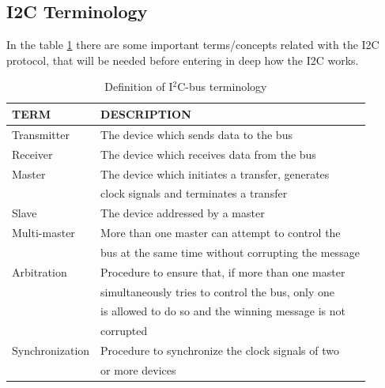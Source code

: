 \subsection{I2C Terminology}
\label{chap:Back_I2C_Terminology}

In the table \ref{tab:i2c_terminology} there are some important terms/concepts related with the 
I2C protocol, that will be needed before entering in deep how the I2C works.

\begin{table}[htbp]
    \centering
    \begin{tabular}{|l | l|}
        \toprule
        TERM            & DESCRIPTION \\        
        \midrule
        Transmitter     & The device which sends data to the bus \\
        \hline
        Receiver        & The device which receives data from the bus\\
        \hline
        Master          & The device which initiates a transfer, generates\\ 
                        & clock signals and terminates a transfer \\
        \hline
        Slave           & The device addressed by a master \\
        \hline
        Multi-master    & More than one master can attempt to control the \\
                        &  bus at the same time without corrupting the message \\
        \hline
        Arbitration     & Procedure to ensure that, if more than one master \\
                        & simultaneously tries to control the bus, only one \\ 
                        & is allowed to do so and the winning message is not \\
                        & corrupted \\
        \hline
        Synchronization & Procedure to synchronize the clock signals of two \\
                        & or more devices \\
        \bottomrule
    \end{tabular}

    \caption
        {
            Definition of I$^2$C-bus terminology \cite{I2CSpec2000}
        }
    \label{tab:i2c_terminology}
\end{table}